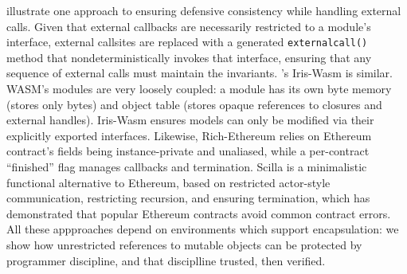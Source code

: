 \citet{CassezFQ24} illustrate one approach to ensuring defensive
consistency while handling external calls.
Given that 
external callbacks
are
necessarily restricted to a module's interface,
external callsites are replaced 
with a
generated \texttt{externalcall()} method that 
nondeterministically invokes
%
that 
interface, 
ensuring that any 
sequence of external calls must maintain the
invariants.
%
%
\citet{iris-wasm-pldi2023}'s Iris-Wasm is similar.
WASM's
modules are very loosely coupled: a module
has its own byte memory
(stores only bytes) 
and object table
(stores opaque references to closures and external handles).
%
%
Iris-Wasm ensures models 
can only be
modified via their explicitly exported interfaces.
%
Likewise, Rich-Ethereum \cite{rich-specs-smart-contracts-oopsla2021}
relies on Ethereum%
contract's fields being instance-private
and unaliased, while
a per-contract ``finished'' flag
manages callbacks and termination.
%
%
%
%
%
Scilla \cite{sergey-scilla-oopsla2019}
is a minimalistic functional alternative to Ethereum,
based on restricted actor-style
communication, restricting recursion, and ensuring termination,
which has demonstrated that popular Ethereum
contracts avoid common contract errors.
%
All these appproaches depend on
environments which support encapsulation:
we show how unrestricted references to mutable objects can be protected
by programmer discipline,
and that disciplline trusted, then verified.

